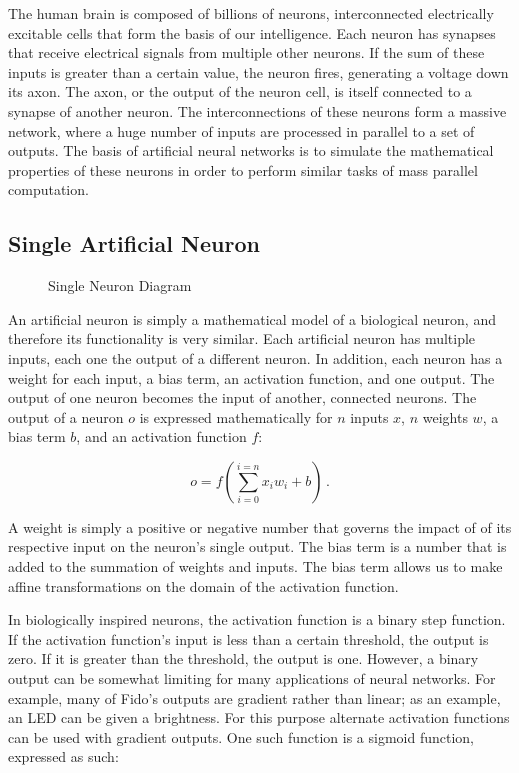 The human brain is composed of billions of neurons, interconnected electrically excitable cells that form the basis of our intelligence. Each neuron has synapses that receive electrical signals from multiple other neurons. If the sum of these inputs is greater than a certain value, the neuron fires, generating a voltage down its axon. The axon, or the output of the neuron cell, is itself connected to a synapse of another neuron. The interconnections of these neurons form a massive network, where a huge number of inputs are processed in parallel to a set of outputs. The basis of artificial neural networks is to simulate the mathematical properties of these neurons in order to perform similar tasks of mass parallel computation.


\subsection{Single Artificial Neuron}


\begin{figure}[ht]
	\centering
	
	\caption{Single Neuron Diagram}
\end{figure}

An artificial neuron is simply a mathematical model of a biological neuron, and therefore its functionality is very similar. Each artificial neuron has multiple inputs, each one the output of a different neuron. In addition, each neuron has a weight for each input, a bias term, an activation function, and one output. The output of one neuron becomes the input of another, connected neurons. The output of a neuron $o$ is expressed mathematically for $n$ inputs $x$, $n$ weights $w$, a bias term $b$, and an activation function $f$:

\begin{equation}
	o = f(\sum_{i=0}^{i=n}x_i w_i + b)
	\,.
\end{equation}

A weight is simply a positive or negative number that governs the impact of of its respective input on the neuron's single output. The bias term is a number that is added to the summation of weights and inputs. The bias term allows us to make affine transformations on the domain of the activation function. 

In biologically inspired neurons, the activation function is a binary step function. If the activation function's input is less than a certain threshold, the output is zero. If it is greater than the threshold, the output is one. However, a binary output can be somewhat limiting for many applications of neural networks. For example, many of Fido's outputs are gradient rather than linear; as an example, an LED can be given a brightness. For this purpose alternate activation functions can be used with gradient outputs. One such function is a sigmoid function, expressed as such:

